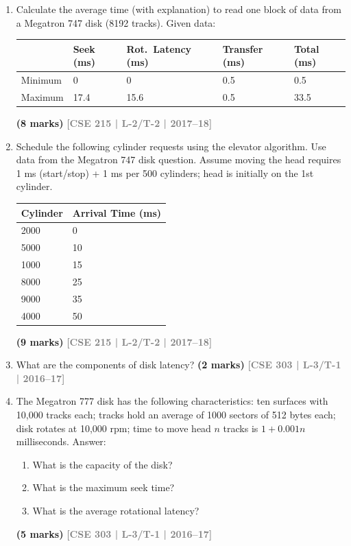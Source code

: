 \documentclass[12pt]{article}
\newcommand{\yr}[1]{\hfill\textcolor{gray}{\small\textbf{[#1]}}}
\newcommand{\mk}[1]{\textcolor{orange!70!black}{\small\textbf{(#1 marks)}}}
\begin{document}
\begin{enumerate}
\item Calculate the average time (with explanation) to read one block of data from a Megatron 747 disk (8192 tracks). Given data:

\medskip
\begin{center}
\begin{tabular}{lllll}
\toprule
 & \textbf{Seek (ms)} & \textbf{Rot.\ Latency (ms)} & \textbf{Transfer (ms)} & \textbf{Total (ms)}\\
\midrule
Minimum & 0 & 0 & 0.5 & 0.5\\
Maximum & 17.4 & 15.6 & 0.5 & 33.5\\
\bottomrule
\end{tabular}
\end{center}
\mk{8} \yr{CSE 215 | L-2/T-2 | 2017--18}


\item Schedule the following cylinder requests using the elevator algorithm. Use data from the Megatron 747 disk question. Assume moving the head requires 1 ms (start/stop) + 1 ms per 500 cylinders; head is initially on the 1st cylinder.
\medskip
\begin{center}
\begin{tabular}{ll}
\toprule
\textbf{Cylinder} & \textbf{Arrival Time (ms)}\\
\midrule
2000 & 0\\
5000 & 10\\
1000 & 15\\
8000 & 25\\
9000 & 35\\
4000 & 50\\
\bottomrule
\end{tabular}
\end{center}
\mk{9} \yr{CSE 215 | L-2/T-2 | 2017--18}


\item What are the components of disk latency?
\mk{2} \yr{CSE 303 | L-3/T-1 | 2016--17}


\item The Megatron 777 disk has the following characteristics: ten surfaces with 10,000 tracks each; tracks hold an average of 1000 sectors of 512 bytes each; disk rotates at 10,000 rpm; time to move head $n$ tracks is $1 + 0.001n$ milliseconds. Answer:
\begin{enumerate}
  \item What is the capacity of the disk?
  \item What is the maximum seek time?
  \item What is the average rotational latency?
\end{enumerate}
\mk{5} \yr{CSE 303 | L-3/T-1 | 2016--17}



\end{enumerate}
\end{document}
